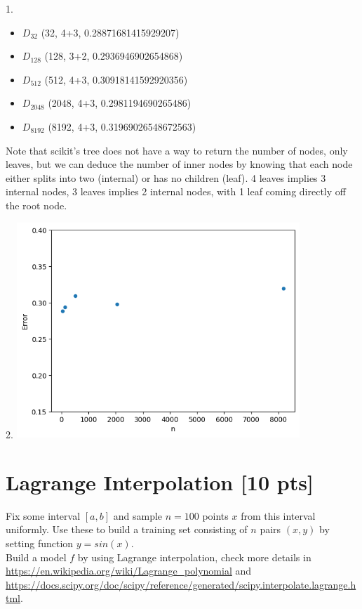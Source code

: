 \documentclass[a4paper]{article}
\theoremstyle{definition}
\begin{document}
1.
\begin{itemize}
        \item $D_{32}$ (32, 4+3, 0.28871681415929207)
        \item $D_{128}$ (128, 3+2, 0.2936946902654868)
        \item $D_{512}$ (512, 4+3, 0.30918141592920356)
        \item $D_{2048}$ (2048, 4+3, 0.2981194690265486)
        \item $D_{8192}$ (8192, 4+3, 0.31969026548672563)
    \end{itemize}
    Note that scikit's tree does not have a way to return the number of nodes, only leaves, but we can deduce the number of inner nodes by knowing that each node either splits into two (internal) or has no children (leaf). 4 leaves implies 3 internal nodes, 3 leaves implies 2 internal nodes, with 1 leaf coming directly off the root node.

2.
\includegraphics[width=0.8\textwidth]{hw2/3_2.png}\\

\newpage
\section{Lagrange Interpolation [10 pts]}
Fix some interval $[a, b]$ and sample $n = 100$ points $x$ from this interval uniformly. Use these to build a training set consisting of $n$ pairs $(x, y)$ by setting function $y = sin(x)$. \\

Build a model $f$ by using Lagrange interpolation, check more details in \url{https://en.wikipedia.org/wiki/Lagrange_polynomial} and \url{https://docs.scipy.org/doc/scipy/reference/generated/scipy.interpolate.lagrange.html}. \\
\end{document}
